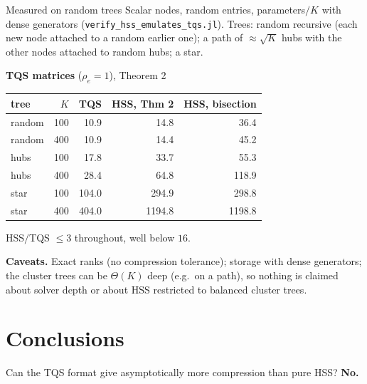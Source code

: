 \documentclass[aspectratio=169,11pt]{beamer}
\begin{document}
\begin{frame}{Measured on random trees}
\footnotesize
Scalar nodes, random entries, parameters$/K$ with dense generators
(\texttt{verify\_hss\_emulates\_tqs.jl}). Trees: random recursive (each new node attached to a random earlier one);
a path of $\approx\sqrt{K}$ hubs with the other nodes attached to random hubs; a star.

\vspace{2mm}
\centering
\textbf{TQS matrices} ($\rho_e=1$), Theorem 2\\[1mm]
\begin{tabular}{lr|r|rr}
\toprule
tree & $K$ & TQS & HSS, Thm 2 & HSS, bisection \\
\midrule
random & 100 & 10.9 & 14.8 & 36.4 \\
random & 400 & 10.9 & 14.4 & 45.2 \\
hubs & 100 & 17.8 & 33.7 & 55.3 \\
hubs & 400 & 28.4 & 64.8 & 118.9 \\
star & 100 & 104.0 & 294.9 & 298.8 \\
star & 400 & 404.0 & 1194.8 & 1198.8 \\
\bottomrule
\end{tabular}

\vspace{1mm}
HSS$/$TQS $\leq 3$ throughout, well below $16$.

\vspace{3mm}
\raggedright
\textbf{Caveats.} Exact ranks (no compression tolerance); storage with dense generators; the cluster trees can be
$\Theta(K)$ deep (e.g.\ on a path), so nothing is claimed about solver depth or about HSS restricted to balanced
cluster trees.
\end{frame}

\section{Conclusions}

\begin{frame}{Can the TQS format give asymptotically more compression than pure HSS?}
\label{sl:answer}\hypertarget{sl:answer}{}
\vfill
\centering
{\Huge\bfseries No.}
\vfill
\end{frame}
\end{document}
